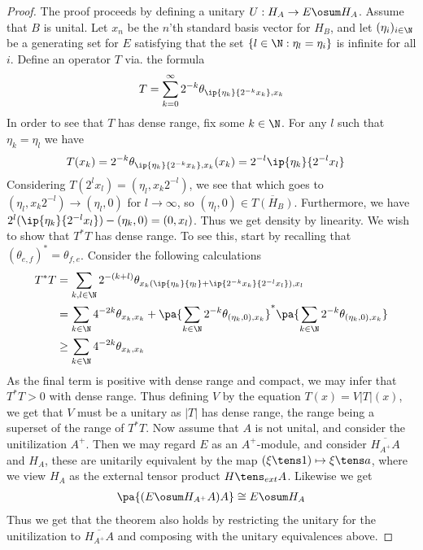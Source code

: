 \begin{proof}
	The proof proceeds by defining a unitary $U: H_A\to E\osum H_A$. Assume that $B$ is unital. Let $x_n$ be the $n$'th standard basis vector for $H_B$, and let $(\eta_i)_{i\in \N}$ be a generating set for $E$ satisfying that the set $\{l\in \N : \eta_l=\eta_i\}$ is infinite for all $i$. Define an operator $T$ via. the formula 
	\begin{align*}
		T=\sum_{k=0}^\infty 2^{-k}\theta_{\ip{\eta_k}{2^{-k}x_k},x_k}
	\end{align*}
	In order to see that $T$ has dense range, fix some $k\in \N$. For any $l$ such that $\eta_k=\eta_l$ we have
	\begin{align*}
		T(x_k)&=2^{-k}\theta_{\ip{\eta_k}{2^{-k}x_k},x_k}(x_k)=2^{-l}\ip{\eta_k}{2^{-l}x_l}
	\end{align*}
	Considering $T(2^l x_l)=(\eta_l,x_k 2^{-l})$, we see that which goes to $(\eta_l,x_k 2^{-l})\to (\eta_l,0)$ for $l\to \infty$, so  $(\eta_l,0)\in \overline{T(H_B)}$. Furthermore, we have $2^l(\ip{\eta_k}{2^{-l}x_l})-(\eta_k,0)=(0,x_l)$. Thus we get density by linearity. 
	We wish to show that $T^*T$ has dense range. To see this, start by recalling that $(\theta_{e,f})^*=\theta_{f,e}$. Consider the following calculations
	\begin{align*}
		T^*T&=\sum_{k,l\in \N} 2^{-(k+l)}\theta_{x_k(\ip{\eta_k}{\eta_l}+\ip{2^{-k}x_k}{2^{-l}x_l}),x_l} \\
		&=\sum_{k\in \N}4^{-2k}\theta_{x_k,x_k}+\pa{\sum_{k\in \N}2^{-k}\theta_{(\eta_k,0),x_k}}^*\pa{\sum_{k\in \N}2^{-k}\theta_{(\eta_k,0),x_k}} \\
		&\geq \sum_{k\in \N}4^{-2k}\theta_{x_k,x_k}
	\end{align*}
	As the final term is positive with dense range and compact, we may infer that $T^*T>0$ with dense range. Thus defining $V$ by the equation $T(x)=V|T|(x)$, we get that $V$ must be a unitary as $|T|$ has dense range, the range being a superset of the range of $T^*T$.
	Now assume that $A$ is not unital, and consider the unitilization $A^+$. Then we may regard $E$ as an $A^+$-module, and consider $\overline{H_{A^+}A}$ and $H_A$, these are unitarily equivalent by the map $(\xi\tens 1)\mapsto \xi\tens a$, where we view $H_A$ as the external tensor product $H\tens_{ext} A$. Likewise we get 
	\begin{align*}
		\pa{(E\osum H_{A^+}A)A}\cong E\osum H_A
	\end{align*}
	Thus we get that the theorem also holds by restricting the unitary for the unitilization to $\overline{H_{A^+}A}$ and composing with the unitary equivalences above. 
\end{proof}
